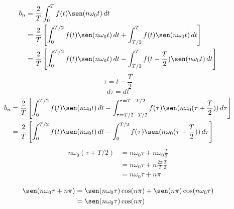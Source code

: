 \begin{equation*}
\begin{split}
    b_n
        &=\frac{2}{T}\int_0^T f(t)\sen(n\omega_0 t)\,dt\\
        &=\frac{2}{T}\left[
            \int_0^{T/2} f(t)\sen(n\omega_0 t)\,dt+
            \int_{T/2}^T f(t)\sen(n\omega_0 t)\,dt
        \right]\\
        &=\frac{2}{T}\left[
            \int_0^{T/2} f(t)\sen(n\omega_0 t)\,dt-
            \int_{T/2}^T f(t-\frac{T}{2})\sen(n\omega_0 t)\,dt
        \right]\\
\end{split}
\end{equation*}
\begin{equation*}
    \tau=t-\frac{T}{2}
\end{equation*}
\begin{equation*}
    d\tau=dt
\end{equation*}
\begin{equation*}
\begin{split}
    b_n
        &=\frac{2}{T}\left[
            \int_0^{T/2} f(t)\sen(n\omega_0 t)\,dt-
            \int_{\tau=T/2-T/2}^{\tau=T-T/2}
                f(\tau)\sen(n\omega_0(\tau+\frac{T}{2}))\,d\tau
        \right]\\
        &=\frac{2}{T}\left[
            \int_0^{T/2} f(t)\sen(n\omega_0 t)\,dt-
            \int_0^{T/2} f(\tau)\sen(n\omega_0(\tau+\frac{T}{2}))\,d\tau
        \right]\\
\end{split}
\end{equation*}
\begin{equation*}
\begin{split}
    n\omega_0(\tau+T/2)
        &=n\omega_0\tau+n\omega_0\frac{T}{2}\\
        &=n\omega_0\tau+n\frac{2\pi}{T}\frac{T}{2}\\
        &=n\omega_0\tau+n\pi\\
\end{split}
\end{equation*}
\begin{equation*}
\begin{split}
    \sen(n\omega_0\tau+n\pi)
        &=\sen(n\omega_0\tau)\cos(n\pi)+\sen(n\pi)\cos(n\omega_0\tau)\\
        &=\sen(n\omega_0\tau)\cos(n\pi)\\
\end{split}
\end{equation*}
